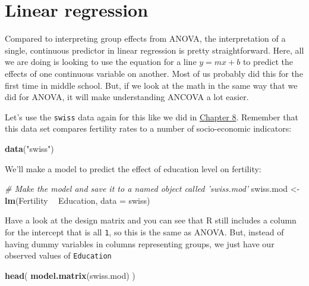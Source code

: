 \documentclass[
]{book}
\newenvironment{Shaded}{\begin{snugshade}}{\end{snugshade}}
\newcommand{\CommentTok}[1]{\textcolor[rgb]{0.56,0.35,0.01}{\textit{#1}}}
\newcommand{\DataTypeTok}[1]{\textcolor[rgb]{0.13,0.29,0.53}{#1}}
\newcommand{\KeywordTok}[1]{\textcolor[rgb]{0.13,0.29,0.53}{\textbf{#1}}}
\newcommand{\NormalTok}[1]{#1}
\newcommand{\OperatorTok}[1]{\textcolor[rgb]{0.81,0.36,0.00}{\textbf{#1}}}
\newcommand{\StringTok}[1]{\textcolor[rgb]{0.31,0.60,0.02}{#1}}
\begin{document}
\hypertarget{linear-regression}{%
\section{Linear regression}\label{linear-regression}}

Compared to interpreting group effects from ANOVA, the interpretation of a single, continuous predictor in linear regression is pretty straightforward. Here, all we are doing is looking to use the equation for a line \(y = mx + b\) to predict the effects of one continuous variable on another. Most of us probably did this for the first time in middle school. But, if we look at the math in the same way that we did for ANOVA, it will make understanding ANCOVA a lot easier.

Let's use the \texttt{swiss} data again for this like we did in \protect\hyperlink{Chapter8}{Chapter 8}. Remember that this data set compares fertility rates to a number of socio-economic indicators:

\begin{Shaded}
\begin{Highlighting}[]
\KeywordTok{data}\NormalTok{(}\StringTok{"swiss"}\NormalTok{)}
\end{Highlighting}
\end{Shaded}

We'll make a model to predict the effect of education level on fertility:

\begin{Shaded}
\begin{Highlighting}[]
\CommentTok{# Make the model and save it to a named object called 'swiss.mod'}
\NormalTok{swiss.mod <-}\StringTok{ }\KeywordTok{lm}\NormalTok{(Fertility }\OperatorTok{~}\StringTok{ }\NormalTok{Education, }\DataTypeTok{data =}\NormalTok{ swiss)}
\end{Highlighting}
\end{Shaded}

Have a look at the design matrix and you can see that R still includes a column for the intercept that is all \texttt{1}, so this is the same as ANOVA. But, instead of having dummy variables in columns representing groups, we just have our observed values of \texttt{Education}

\begin{Shaded}
\begin{Highlighting}[]
\KeywordTok{head}\NormalTok{( }\KeywordTok{model.matrix}\NormalTok{(swiss.mod) )}
\end{Highlighting}
\end{Shaded}
\end{document}
